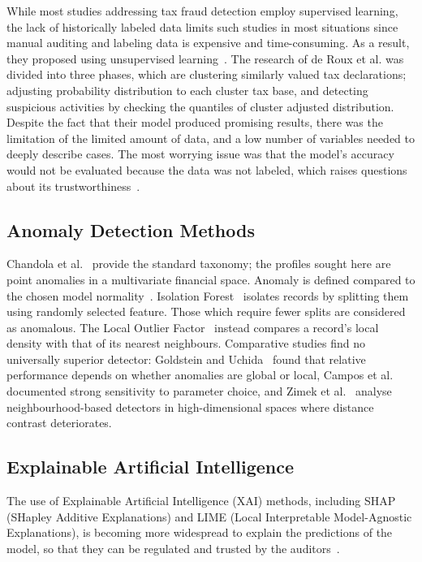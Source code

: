 While most studies addressing tax fraud detection employ supervised learning, the lack of historically labeled data limits such studies in most situations since manual auditing and labeling data is expensive and time-consuming. As a result, they proposed using unsupervised learning~\cite{roux2018tax}. The research of de Roux et al. was divided into three phases, which are clustering similarly valued tax declarations; adjusting probability distribution to each cluster tax base, and detecting suspicious activities by checking the quantiles of cluster adjusted distribution. Despite the fact that their model produced promising results, there was the limitation of the limited amount of data, and a low number of variables needed to deeply describe cases. The most worrying issue was that the model's accuracy would not be evaluated because the data was not labeled, which raises questions about its trustworthiness~\cite{murorunkwere2022fraud}.

\subsection{Anomaly Detection Methods}

Chandola et al.~\cite{chandola2009anomaly} provide the standard taxonomy; the profiles sought here are point anomalies in a multivariate financial space. Anomaly is defined compared to the chosen model normality~\cite{aggarwal2017outlier}. Isolation Forest~\cite{liu2008isolation,liu2012isolation} isolates records by splitting them using randomly selected feature. Those which require fewer splits are considered as anomalous. The Local Outlier Factor~\cite{breunig2000lof} instead compares a record's local density with that of its nearest neighbours. Comparative studies find no universally superior detector: Goldstein and Uchida~\cite{goldstein2016comparative} found that relative performance depends on whether anomalies are global or local, Campos et al.~\cite{campos2016evaluation} documented strong sensitivity to parameter choice, and Zimek et al.~\cite{zimek2012survey} analyse neighbourhood-based detectors in high-dimensional spaces where distance contrast deteriorates.

\subsection{Explainable Artificial Intelligence}

The use of Explainable Artificial Intelligence (XAI) methods, including SHAP (SHapley Additive Explanations) and LIME (Local Interpretable Model-Agnostic Explanations), is becoming more widespread to explain the predictions of the model, so that they can be regulated and trusted by the auditors~\cite{chen2024explainable}.

